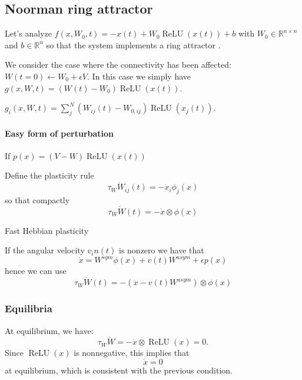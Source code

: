 \documentclass{article}
\theoremstyle{definition} \newtheorem{definition}{Definition}
\theoremstyle{remark} \newtheorem{remark}{Remark}
\newcommand{\reals}{\mathbb{R}}
\newcommand{\relu}{\operatorname{ReLU}}
\newcounter{ct}
\begin{document}
\subsection{Noorman ring attractor}
Let's analyze $f(x,W_0,t) = -x(t) + W_0\relu(x(t)) + b$ with $W_0\in\reals^{n\times n}$ and $b\in\reals^n$ so that the system implements a ring attractor \citep{noorman2024accurate}.

We consider the case where the connectivity has been affected: $W(t=0) \leftarrow W_0 + \epsilon V$.
In this case we simply have $g(x,W,t) = (W(t)-W_0)\relu(x(t))$.

$g_i(x,W,t) = \sum_{j}^N(W_{ij}(t)-W_{0,ij})\relu(x_j(t))$.


\paragraph{Easy form of perturbation}
If $p(x) = (V-W)\relu(x(t))$


Define the plasticity rule
\begin{equation}\label{eq:plasticity_heur}
\tau_W\dot W_{ij}(t) = - \dot x_i \phi_j(x) 
\end{equation}
so that compactly
\begin{equation}\label{eq:plasticity_heur_comp}
\tau_W\dot W(t) = - \dot x \otimes \phi(x) 
\end{equation}

Fast Hebbian plasticity \citep{lansner2023fast}

If the angular velocity $v_in(t)$ is nonzero we have that 
\begin{equation}
\dot x = W^{sym}\phi(x) + v(t)W^{asym} + \epsilon p(x)
\end{equation}
hence we can use
\begin{equation}\label{eq:plasticity_heur_comp_vin}
\tau_W\dot W(t) = - (\dot x - v(t)W^{asym}) \otimes \phi(x) 
\end{equation}

\subsubsection{Equilibria}
At equilibrium, we have:
\begin{equation}
    \tau_W \dot{W} = - \dot{x} \otimes \operatorname{ReLU}(x) = 0.
\end{equation}
Since \( \operatorname{ReLU}(x) \) is nonnegative, this implies that
\begin{equation}
    \dot{x} = 0
\end{equation}
at equilibrium, which is consistent with the previous condition.
\end{document}
